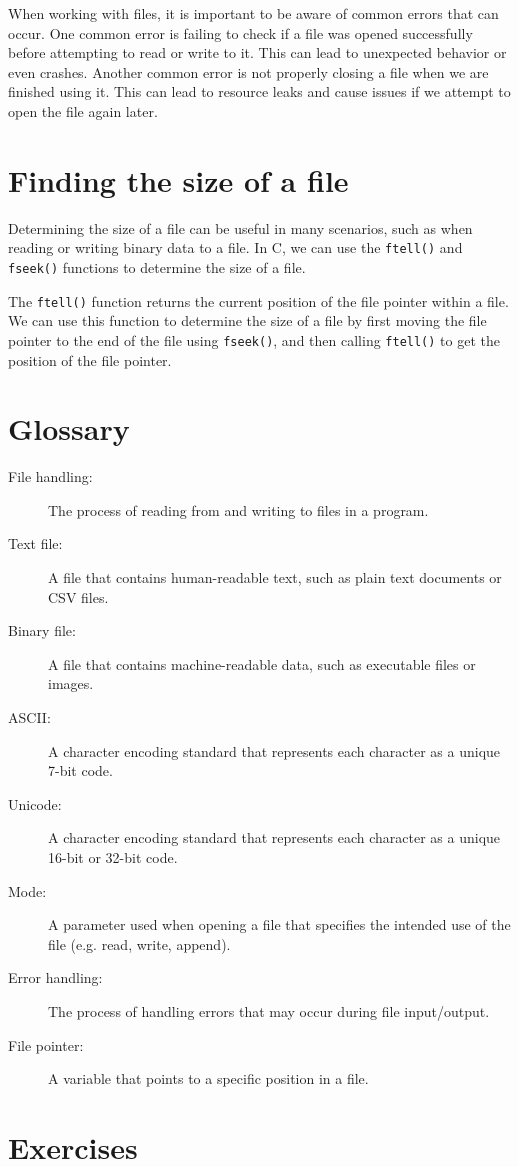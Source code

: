 When working with files, it is important to be aware of common errors that can
occur. One common error is failing to check if a file was opened successfully
before attempting to read or write to it. This can lead to unexpected behavior
or even crashes. Another common error is not properly closing a file when we
are finished using it. This can lead to resource leaks and cause issues if we
attempt to open the file again later.

\section{Finding the size of a file}

Determining the size of a file can be useful in many scenarios, such as when reading or writing binary data to a file. In C, we can use the {\tt ftell()} and {\tt fseek()} functions to determine the size of a file.

The {\tt ftell()} function returns the current position of the file pointer within a file. We can use this function to determine the size of a file by first moving the file pointer to the end of the file using {\tt fseek()}, and then calling {\tt ftell()} to get the position of the file pointer.

\section{Glossary}

\begin{description}
	\item[File handling:] The process of reading from and writing to files in a program.
	\item[Text file:] A file that contains human-readable text, such as plain text documents or CSV files.
	\item[Binary file:] A file that contains machine-readable data, such as executable files or images.
	\item[ASCII:] A character encoding standard that represents each character as a unique 7-bit code.
	\item[Unicode:] A character encoding standard that represents each character as a unique 16-bit or 32-bit code.
	\item[Mode:] A parameter used when opening a file that specifies the intended use of the file (e.g. read, write, append).
	\item[Error handling:] The process of handling errors that may occur during file input/output.
	\item[File pointer:] A variable that points to a specific position in a file.
\end{description}

\section{Exercises}
\setcounter{exercisenum}{0}




